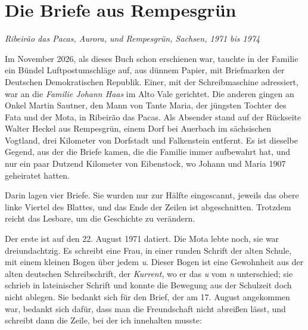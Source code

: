 \documentclass[
  ngerman,
  11pt,
  openany]{book}
\begin{document}
\section{Die Briefe aus Rempesgrün}\label{die-briefe-aus-rempesgruxfcn}

\emph{Ribeirão das Pacas, Aurora, und Rempesgrün, Sachsen, 1971 bis
1974}

Im November 2026, als dieses Buch schon erschienen war, tauchte in der
Familie ein Bündel Luftpostumschläge auf, aus dünnem Papier, mit
Briefmarken der Deutschen Demokratischen Republik. Einer, mit der
Schreibmaschine adressiert, war an die \emph{Familie Johann Haas} im
Alto Vale gerichtet. Die anderen gingen an Onkel Martin Sautner, den
Mann von Tante Maria, der jüngsten Tochter des Fata und der Mota, in
Ribeirão das Pacas. Als Absender stand auf der Rückseite Walter Heckel
aus Rempesgrün, einem Dorf bei Auerbach im sächsischen Vogtland, drei
Kilometer von Dorfstadt und Falkenstein entfernt. Es ist dieselbe
Gegend, aus der die Briefe kamen, die die Familie immer aufbewahrt hat,
und nur ein paar Dutzend Kilometer von Eibenstock, wo Johann und Maria
1907 geheiratet hatten.

Darin lagen vier Briefe. Sie wurden nur zur Hälfte eingescannt, jeweils
das obere linke Viertel des Blattes, und das Ende der Zeilen ist
abgeschnitten. Trotzdem reicht das Lesbare, um die Geschichte zu
verändern.

Der erste ist auf den 22. August 1971 datiert. Die Mota lebte noch, sie
war dreiundachtzig. Es schreibt eine Frau, in einer runden Schrift der
alten Schule, mit einem kleinen Bogen über jedem \emph{u}. Dieser Bogen
ist eine Gewohnheit aus der alten deutschen Schreibschrift, der
\emph{Kurrent}, wo er das \emph{u} vom \emph{n} unterschied; sie schrieb
in lateinischer Schrift und konnte die Bewegung aus der Schulzeit doch
nicht ablegen. Sie bedankt sich für den Brief, der am 17. August
angekommen war, bedankt sich dafür, dass man die Freundschaft nicht
abreißen lässt, und schreibt dann die Zeile, bei der ich innehalten
musste:
\end{document}
